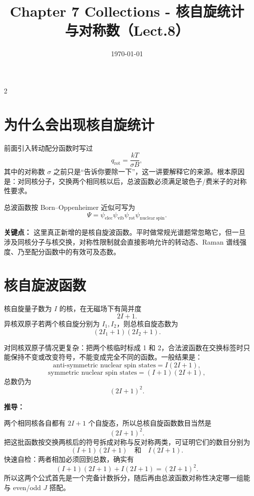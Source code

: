 \documentclass[a4paper,9pt]{article}
\title{\vspace{-2em}\Large\bfseries\color{sectioncolor} Chapter 7 Collections - 核自旋统计与对称数（Lect.8）\vspace{-1em}}
\author{}
\date{\today}
\newenvironment{keypoint}
{\par\vspace{0.3em}\noindent\begin{tcolorbox}[colback=keybg,colframe=keycolor,boxrule=0.5pt,arc=2pt,left=2pt,right=2pt,top=2pt,bottom=2pt,boxsep=0pt]\noindent\textcolor{keycolor}{\textbf{关键点：}}}
{\end{tcolorbox}\par\vspace{0.3em}}
\newenvironment{derivation}
{\par\vspace{0.3em}\noindent\begin{tcolorbox}[colback=boxbg,colframe=derivcolor,boxrule=0.5pt,arc=2pt,left=2pt,right=2pt,top=2pt,bottom=2pt,boxsep=0pt]\scriptsize\noindent\textcolor{derivcolor}{\textbf{推导：}}\par}
{\end{tcolorbox}\par\vspace{0.3em}}
\begin{document}
\maketitle
\thispagestyle{fancy}
\begin{multicols}{2}
	\scriptsize{\tableofcontents}

	\section{为什么会出现核自旋统计}

	前面引入转动配分函数时写过
	\[
		q_{\mathrm{rot}}=\frac{kT}{\sigma B},
	\]
	其中的对称数 $\sigma$ 之前只是“告诉你要除一下”，这一讲要解释它的来源。根本原因是：对同核分子，交换两个相同核以后，总波函数必须满足玻色子/费米子的对称性要求。

	总波函数按 Born--Oppenheimer 近似可写为
	\[
		\Psi=\psi_{\mathrm{elec}}\psi_{\mathrm{vib}}\psi_{\mathrm{rot}}\psi_{\mathrm{nuclear\ spin}}.
	\]

	\begin{keypoint}
		这里真正新增的是核自旋波函数。平时做常规光谱题常忽略它，但一旦涉及同核分子与核交换，对称性限制就会直接影响允许的转动态、Raman 谱线强度、乃至配分函数中的有效可及态数。
	\end{keypoint}

	\section{核自旋波函数}

	核自旋量子数为 $I$ 的核，在无磁场下有简并度
	\[
		2I+1.
	\]
	异核双原子若两个核自旋分别为 $I_1,I_2$，则总核自旋态数为
	\[
		(2I_1+1)(2I_2+1).
	\]

	对同核双原子情况更复杂：把两个核临时标成 1 和 2，合法波函数在交换标签时只能保持不变或改变符号，不能变成完全不同的函数。一般结果是：
	\[
		\text{anti-symmetric nuclear spin states}=I(2I+1),
	\]
	\[
		\text{symmetric nuclear spin states}=(I+1)(2I+1),
	\]
	总数仍为
	\[
		(2I+1)^2.
	\]

	\begin{derivation}
		两个相同核各自都有 $2I+1$ 个自旋态，所以总核自旋函数数目当然是
		\[
			(2I+1)^2.
		\]
		把这批函数按交换两核后的符号拆成对称与反对称两类，可证明它们的数目分别为
		\[
			(I+1)(2I+1)
			\quad\text{和}\quad
			I(2I+1).
		\]
		快速自检：两者相加必须回到总数，确实有
		\[
			(I+1)(2I+1)+I(2I+1)=(2I+1)^2.
		\]
		所以这两个公式首先是一个完备计数拆分，随后再由总波函数对称性决定哪一组能与 even/odd $J$ 搭配。
	\end{derivation}


\end{multicols}
\end{document}
